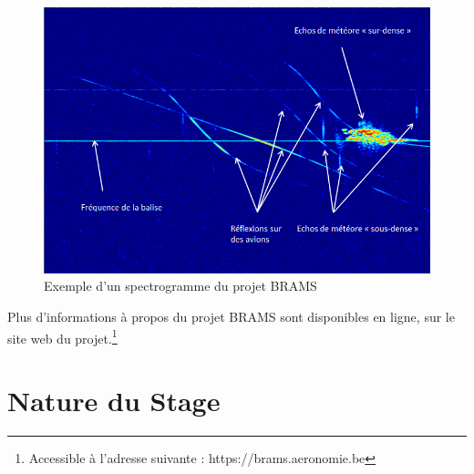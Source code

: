 \documentclass[11pt]{article}
\begin{document}
\begin{figure}[t]
    \begin{center}
        \includegraphics[scale=0.493]{spectrogramme.png}
        \caption{Exemple d'un spectrogramme du projet BRAMS}
    \end{center}
\end{figure}

\vspace{10pt}
Plus d'informations à propos du projet BRAMS sont disponibles en ligne, sur le site web du projet.\footnote{Accessible à l’adresse suivante : https://brams.aeronomie.be}

\newpage

\section{Nature du Stage}
\end{document}
